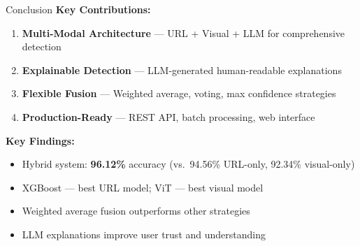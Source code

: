 \documentclass[aspectratio=169,12pt]{beamer}
\begin{document}
\begin{frame}{Conclusion}
    \textbf{Key Contributions:}
    \begin{enumerate}
        \item \textbf{Multi-Modal Architecture} --- URL + Visual + LLM for comprehensive detection
        \item \textbf{Explainable Detection} --- LLM-generated human-readable explanations
        \item \textbf{Flexible Fusion} --- Weighted average, voting, max confidence strategies
        \item \textbf{Production-Ready} --- REST API, batch processing, web interface
    \end{enumerate}
    \vspace{0.4cm}
    \textbf{Key Findings:}
    \begin{itemize}
        \item Hybrid system: \textbf{96.12\%} accuracy (vs.\ 94.56\% URL-only, 92.34\% visual-only)
        \item XGBoost --- best URL model; ViT --- best visual model
        \item Weighted average fusion outperforms other strategies
        \item LLM explanations improve user trust and understanding
    \end{itemize}
\end{frame}
\end{document}
